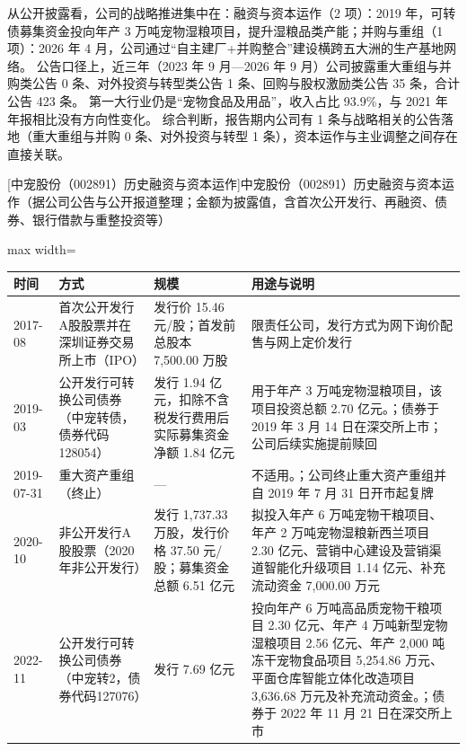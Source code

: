 从公开披露看，公司的战略推进集中在：融资与资本运作（2 项）：2019 年，可转债募集资金投向年产 3 万吨宠物湿粮项目，提升湿粮品类产能；并购与重组（1 项）：2026 年 4 月，公司通过“自主建厂+并购整合”建设横跨五大洲的生产基地网络。 公告口径上，近三年（2023 年 9 月---2026 年 9 月）公司披露重大重组与并购类公告 0 条、对外投资与转型类公告 1 条、回购与股权激励类公告 35 条，合计公告 423 条。 第一大行业仍是“宠物食品及用品”，收入占比 93.9\%，与 2021 年年报相比没有方向性变化。 综合判断，报告期内公司有 1 条与战略相关的公告落地（重大重组与并购 0 条、对外投资与转型 1 条），资本运作与主业调整之间存在直接关联。

\begin{center}\small\setlength{\tabcolsep}{4pt}
[中宠股份（002891）历史融资与资本运作]{中宠股份（002891）历史融资与资本运作（据公司公告与公开报道整理；金额为披露值，含首次公开发行、再融资、债券、银行借款与重整投资等）}
\begin{adjustbox}{max width=\textwidth}
\begin{tabular}{@{}p{1.45cm}p{2.55cm}p{4.05cm}p{4.95cm}@{}}
\toprule
时间 & 方式 & 规模 & 用途与说明 \\
\midrule
2017-08 & 首次公开发行A股股票并在深圳证券交易所上市（IPO） & 发行价 15.46 元/\allowbreak{}股；首发前总股本 7,\allowbreak{}500.00 万股 & 限责任公司，\allowbreak{}发行方式为网下询价配售与网上定价发行 \\
2019-03 & 公开发行可转换公司债券（中宠转债，债券代码128054） & 发行 1.94 亿元，\allowbreak{}扣除不含税发行费用后实际募集资金净额 1.84 亿元 & 用于年产 3 万吨宠物湿粮项目，\allowbreak{}该项目投资总额 2.70 亿元。；债券于 2019 年 3 月 14 日在深交所上市；公司后续实施提前赎回 \\
2019-07-31 & 重大资产重组（终止） & --- & 不适用。；公司终止重大资产重组并自 2019 年 7 月 31 日开市起复牌 \\
2020-10 & 非公开发行A股股票（2020年非公开发行） & 发行 1,\allowbreak{}737.33 万股，\allowbreak{}发行价格 37.50 元/\allowbreak{}股；募集资金总额 6.51 亿元 & 拟投入年产 6 万吨宠物干粮项目、\allowbreak{}年产 2 万吨宠物湿粮新西兰项目 2.30 亿元、\allowbreak{}营销中心建设及营销渠道智能化升级项目 1.14 亿元、\allowbreak{}补充流动资金 7,\allowbreak{}000.00 万元 \\
2022-11 & 公开发行可转换公司债券（中宠转2，债券代码127076） & 发行 7.69 亿元 & 投向年产 6 万吨高品质宠物干粮项目 2.30 亿元、\allowbreak{}年产 4 万吨新型宠物湿粮项目 2.56 亿元、\allowbreak{}年产 2,\allowbreak{}000 吨冻干宠物食品项目 5,\allowbreak{}254.86 万元、\allowbreak{}平面仓库智能立体化改造项目 3,\allowbreak{}636.68 万元及补充流动资金。；债券于 2022 年 11 月 21 日在深交所上市 \\

\end{tabular}
\end{adjustbox}
\end{center}
